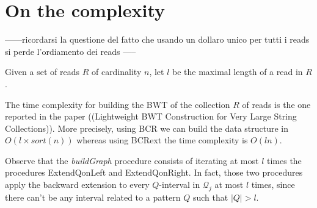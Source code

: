 \documentclass[runningheads,envcountsame,a4paper]{llncs}
\newcommand{\st}{s.t.\xspace}
\renewcommand{\emptyset}{\ensuremath{\varnothing}}
\begin{document}
\begin{comment}
\begin{algorithm}
\SetKwInOut{Input}{Input}\SetKwInOut{Output}{Output}



Update $\Pi$ \st $\Pi[i]$ is the number of $\sigma_i$ in $B'[0,b'-1]$\;
Create a vector $\pi$ of $|\Sigma|$ counters \st $\pi[i]$ is the number of $\sigma_i$ in $B'[b',e')$\;

$X \gets \emptyset$\;

\ForEach{$i \gets 1$ \KwTo  $|\Sigma|$}{
\tcp{compute the start of the $\sigma_i Q'$-interval}
   $b'_e \gets |R'|+C'(\sigma_i, R')+ \Pi[i]$\;
\tcp{compute the end of the $\sigma_i Q'$-interval}
   $e'_e \gets b'_e + \pi[i]$\;
   add $[b'_e, e'_e)$ to $X$\;
}

\tcp{update $\Pi$ \st $\Pi[i]$ is the number of $\sigma_i$ in $B'[0,e'-1]$}
$\Pi \gets \Pi+\pi$\;

\Return{X}\;

\caption{processSingleInterval($[b',e')$, $B'$, $\Pi$)}
\label{alg:process-linked-interval}
\end{algorithm}
\end{comment}
\section{On the complexity}


------ricordarsi la questione del fatto che usando un  dollaro unico per tutti i reads si perde l'ordiamento  dei reads  -----



Given a set of reads $R$ of cardinality $n$, let $l$ be the maximal
length of a read in $R$.


The time complexity for building the BWT of the collection $R$ of reads
is the one reported in the paper ((Lightweight BWT Construction for Very
Large String Collections)\cite{}).
More precisely, using BCR we can build the data structure in
$O(l\times sort(n))$ whereas using BCRext the time complexity
is $O(ln)$.

Observe that the \emph{buildGraph} procedure consists of iterating at most $l$
times the procedures ExtendQonLeft and ExtendQonRight.
In fact, those two procedures
apply the backward extension to every $Q$-interval in $\mathcal{Q}_j$ at
most $l$ times, since there can't be any interval related to a pattern
$Q$ such that $|Q| > l$. %
\end{document}
